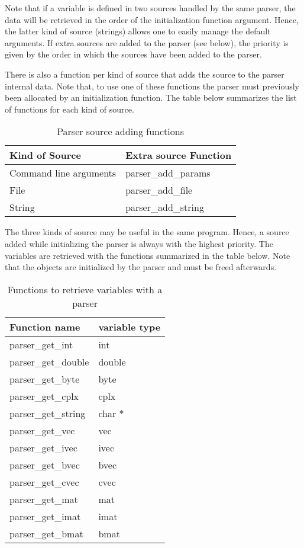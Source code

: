 Note that if a variable is defined in two sources handled by the same
parser, the data will be retrieved in the order of the initialization
function argument. Hence, the latter kind of source (strings) allows
one to easily manage the default arguments.  If extra sources are
added to the parser (see below), the priority is given by the order in
which the sources have been added to the parser.

There is also a function per kind of source that adds the source to
the parser internal data.  Note that, to use one of these functions
the parser must previously been allocated by an initialization
function.  The table below summarizes the list of
functions for each kind of source.


\begin{table}
\begin{center}
\begin{tabular}{|p{5cm}p{5cm}|}
\hline
Kind of Source & Extra source Function \\
\hline
Command line arguments & parser\_add\_params \\
File & parser\_add\_file \\
String & parser\_add\_string \\ 
\hline
\end{tabular}
\caption{Parser source adding functions}
\end{center}
\end{table}

The three kinds of source may be useful in the same program.  Hence, a
source added while initializing the parser is always with the highest
priority.  The variables are retrieved with the functions summarized
in the table below.  Note that the objects are initialized by the
parser and must be freed afterwards.  


\begin{table}
\begin{center}
\begin{tabular}{|p{5cm}p{5cm}|}
\hline
Function name & variable type \\
\hline
parser\_get\_int & int \\
parser\_get\_double & double \\
parser\_get\_byte & byte \\
parser\_get\_cplx & cplx \\
parser\_get\_string & char * \\
parser\_get\_vec & vec \\
parser\_get\_ivec & ivec \\
parser\_get\_bvec & bvec \\
parser\_get\_cvec & cvec \\
parser\_get\_mat & mat \\
parser\_get\_imat & imat \\
parser\_get\_bmat & bmat \\
\hline
\end{tabular}
\caption{Functions to retrieve variables with a parser}
\end{center}
\end{table}


